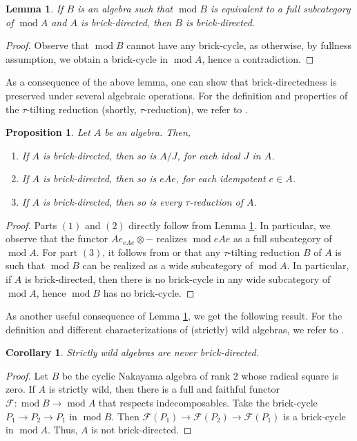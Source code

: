 \documentclass{amsart}
\theoremstyle{thmstyle}
\newtheorem{lemma}[thm]{Lemma}
\newtheorem{proposition}[thm]{Proposition}
\newtheorem{corollary}[thm]{Corollary}
\theoremstyle{exstyle}
\theoremstyle{defstyle}
\theoremstyle{remstyle}
\theoremstyle{remstyle}
\DeclareMathOperator*{\modu}{mod}
\begin{document}
\begin{lemma} \label{Lemma: full subcategory}
If $B$ is an algebra such that $\modu B$ is equivalent to a full subcategory of $\modu A$ and $A$ is brick-directed, then $B$ is brick-directed.
\end{lemma}
\begin{proof}
Observe that $\modu B$ cannot have any brick-cycle, as otherwise, by fullness assumption, we obtain a brick-cycle in $\modu A$, hence a contradiction.
\end{proof}

As a consequence of the above lemma, one can show that brick-directedness is preserved under several algebraic operations. For the definition and properties of the $\tau$-tilting reduction (shortly, $\tau$-reduction), we refer to \cite{Ja}.

\begin{proposition}\label{Prop: some properties of brick-directed algebras}
Let $A$ be an algebra. Then, 
\begin{enumerate}
    \item If $A$ is brick-directed, then so is $A/J$, for each ideal $J$ in $A$.
    \item If $A$ is brick-directed, then so is $eAe$, for each idempotent $e\in A$.
    \item If $A$ is brick-directed, then so is every $\tau$-reduction of $A$.
\end{enumerate}
\end{proposition}

\begin{proof}
Parts $(1)$ and $(2)$ directly follow from Lemma \ref{Lemma: full subcategory}. In particular, we observe that the functor $Ae _{eAe}\otimes - $ realizes $\modu eAe$ as a full subcategory of $\modu A$. For part $(3)$, it follows from \cite[Theorem 3.8]{Ja} or \cite[Theorem 4.12 (b)]{DI+} that any $\tau$-tilting reduction $B$ of $A$ is such that $\modu B$ can be realized as a wide subcategory of $\modu A$. In particular, if $A$ is brick-directed, then there is no brick-cycle in any wide subcategory of $\modu A$, hence $\modu B$ has no brick-cycle.
\end{proof}

As another useful consequence of Lemma \ref{Lemma: full subcategory}, we get the following result. For the definition and different characterizations of (strictly) wild algebras, we refer to \cite[Chapter XIX]{SS}.

\begin{corollary}\label{Cor: strictly wild is never brick-directed}
Strictly wild algebras are never brick-directed.
\end{corollary}
\begin{proof}
Let $B$ be the cyclic Nakayama algebra of rank $2$ whose radical square is zero. If $A$ is strictly wild, then there is a full and faithful functor $\mathcal{F}: \modu B \to \modu A$ that respects indecomposables. Take the brick-cycle $P_1 \to P_2 \to P_1$ in $\modu B$. Then $\mathcal{F}(P_1) \to \mathcal{F}(P_2) \to \mathcal{F}(P_1)$ is a brick-cycle in $\modu A$. Thus, $A$ is not brick-directed.
\end{proof}
\end{document}
